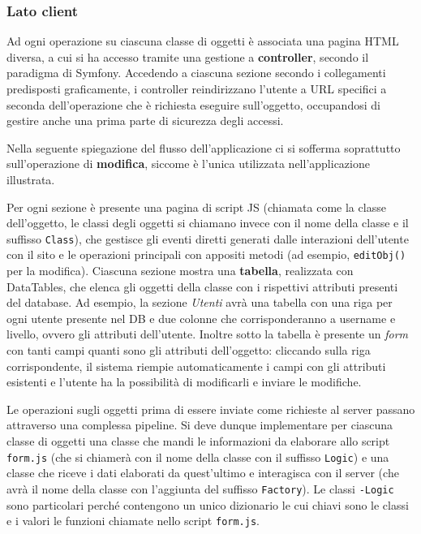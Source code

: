\subsubsection{Lato client}

Ad ogni operazione su ciascuna classe di oggetti è associata una pagina HTML diversa, a cui si ha accesso tramite una gestione a \textbf{controller}, secondo il paradigma di Symfony. Accedendo a ciascuna sezione secondo i collegamenti predisposti graficamente, i controller reindirizzano l'utente a URL specifici a seconda dell'operazione che è richiesta eseguire sull'oggetto, occupandosi di gestire anche una prima parte di sicurezza degli accessi. 

Nella seguente spiegazione del flusso dell'applicazione ci si sofferma soprattutto sull'operazione di \textbf{modifica}, siccome è l'unica utilizzata nell'applicazione illustrata.

Per ogni sezione è presente una pagina di script JS (chiamata come la classe dell'oggetto, le classi degli oggetti si chiamano invece con il nome della classe e il suffisso \texttt{Class}), che gestisce gli eventi diretti generati dalle interazioni dell'utente con il sito e le operazioni principali con appositi metodi (ad esempio, \texttt{editObj()} per la modifica). Ciascuna sezione mostra una \textbf{tabella}, realizzata con DataTables, che elenca gli oggetti della classe con i rispettivi attributi presenti del database. Ad esempio, la sezione \emph{Utenti} avrà una tabella con una riga per ogni utente presente nel DB e due colonne che corrisponderanno a username e livello, ovvero gli attributi dell'utente. Inoltre sotto la tabella è presente un \emph{form} con tanti campi quanti sono gli attributi dell'oggetto: cliccando sulla riga corrispondente, il sistema riempie automaticamente i campi con gli attributi esistenti e l'utente ha la possibilità di modificarli e inviare le modifiche. 

Le operazioni sugli oggetti prima di essere inviate come richieste al server passano attraverso una complessa pipeline.
Si deve dunque implementare per ciascuna classe di oggetti una classe che mandi le informazioni da elaborare allo script \texttt{form.js} (che si chiamerà con il nome della classe con il suffisso \texttt{Logic}) e una classe che riceve i dati elaborati da quest'ultimo e interagisca con il server (che avrà il nome della classe con l'aggiunta del suffisso \texttt{Factory}). Le classi \texttt{-Logic} sono particolari perché contengono un unico dizionario le cui chiavi sono le classi e i valori le funzioni chiamate nello script \texttt{form.js}.

